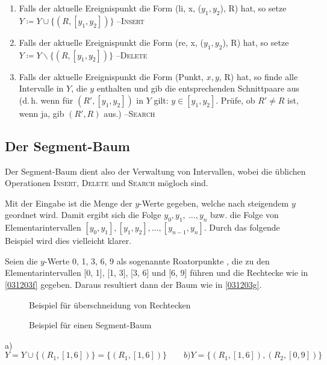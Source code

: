\documentclass[ngerman,draft,parskip=half*,twoside]{scrreprt}
\theoremstyle{break}
\theoremstyle{nonumberbreak}
\begin{document}
\begin{enumerate}
\item Falls der aktuelle Ereignispunkt die Form (li, x, ($y_1,y_2$), R) hat, so setze $Y\coloneqq Y\cup \{(R, [y_1,y_2])\}$ --\textsc{Insert}
\item Falls der aktuelle Ereignispunkt die Form (re, x, ($y_1,y_2$), R) hat, so setze $Y\coloneqq Y\backslash\{(R, [y_1,y_2])\}$
--\textsc{Delete}
\item Falls der aktuelle Ereignispunkt die Form (Punkt, $x,y$, R) hat, so finde alle Intervalle in $Y$, die $y$  enthalten und gib die
entsprechenden Schnittpaare aus (d.\,h. wenn für $(R', [y_1,y_2])$ in
$Y$ gilt: $y \in [y_1,y_2]$. Prüfe, ob $R'\neq R$ ist, wenn ja, gib $(R', R)$ aus.) --\textsc{Search}
\end{enumerate}
\subsection{Der Segment-Baum}
Der Segment-Baum dient also der Verwaltung von Intervallen, wobei die üblichen Operationen \textsc{Insert}, \textsc{Delete} und
\textsc{Search} mögloch sind.

Mit der Eingabe ist die Menge der $y$-Werte gegeben, welche nach steigendem $y$ geordnet wird. Damit ergibt sich die Folge $y_0,y_1,\
\ldots,y_n$ bzw. die Folge von Elementarintervallen $[y_0,y_1],[y_1,y_2],\ldots,[y_{n-1},y_n]$. Durch das folgende
Beispiel wird dies vielleicht klarer.

Seien die $y$-Werte 0, 1, 3, 6, 9 als sogenannte Roatorpunkte , die zu den Elementarintervallen
[0, 1], [1, 3], [3, 6] und [6, 9] führen und die Rechtecke wie in \autoref{031203f} gegeben. Daraus resultiert dann der Baum wie in \autoref{031203g}.

\begin{figure}[H]
\centering

\caption{Beispiel für überschneidung von Rechtecken}
\label{031203f}

\end{figure}

\begin{figure}[H]
\centering
 
\caption{Beispiel für einen Segment-Baum}
\label{031203g}

\end{figure}

 a) $Y=Y \cup \{(R_1, [1, 6])\}=\{(R_1, [1, 6])\} \hspace{2em} b) Y=\{(R_1, [1, 6]), (R_2, [0, 9]) \}$
\end{document}
